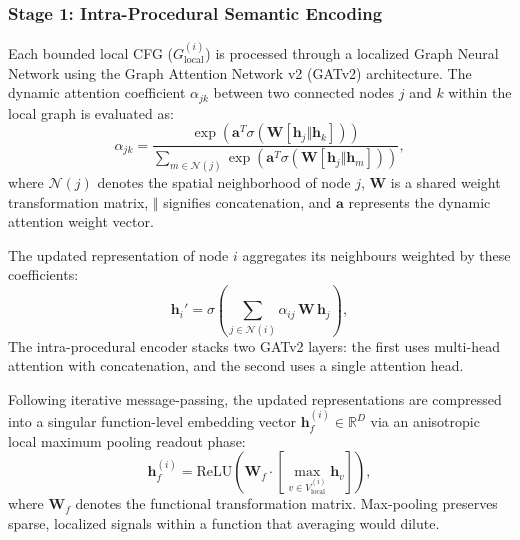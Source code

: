 \documentclass{llncs}
\begin{document}
\subsubsection{Stage 1: Intra-Procedural Semantic Encoding}
Each bounded local CFG ($G_{\text{local}}^{(i)}$) is processed through a localized Graph Neural Network using the Graph Attention Network v2 (GATv2) architecture. The dynamic attention coefficient $\alpha_{jk}$ between two connected nodes $j$ and $k$ within the local graph is evaluated as:
\begin{equation}
\alpha_{jk} = \frac{\exp\left(\mathbf{a}^{T} \sigma\left(\mathbf{W} [\mathbf{h}_{j} \Vert \mathbf{h}_{k}]\right)\right)}{\sum_{m \in \mathcal{N}(j)} \exp\left(\mathbf{a}^{T} \sigma\left(\mathbf{W} [\mathbf{h}_{j} \Vert \mathbf{h}_{m}]\right)\right)},
\end{equation}
where $\mathcal{N}(j)$ denotes the spatial neighborhood of node $j$, $\mathbf{W}$ is a shared weight transformation matrix, $\Vert$ signifies concatenation, and $\mathbf{a}$ represents the dynamic attention weight vector. 

The updated representation of node $i$ aggregates its neighbours weighted by these
coefficients:
\begin{equation}
\mathbf{h}_{i}' = \sigma\!\left( \sum_{j \in \mathcal{N}(i)} \alpha_{ij}\, \mathbf{W}\, \mathbf{h}_{j} \right),
\end{equation}
The intra-procedural encoder stacks two GATv2 layers: the first uses multi-head attention with
concatenation, and the second uses a single attention head.

Following iterative message-passing, the updated representations are compressed into a singular function-level embedding vector $\mathbf{h}_{f}^{(i)} \in \mathbb{R}^{D}$ via an anisotropic local maximum pooling readout phase:
\begin{equation}
\mathbf{h}_{f}^{(i)} = \mathrm{ReLU}\left(\mathbf{W}_{f} \cdot \left[ \max_{v \in V_{\text{local}}^{(i)}} \mathbf{h}_{v} \right] \right),
\end{equation}
where $\mathbf{W}_{f}$ denotes the functional transformation matrix. Max-pooling preserves sparse, localized signals within a function that averaging would dilute.
\end{document}
